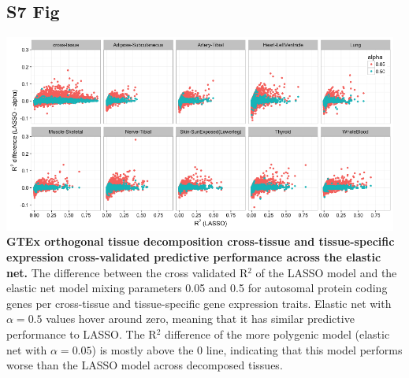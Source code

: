 \documentclass[10pt,letterpaper]{article}
\begin{document}
\begin{singlespace}
\subsection*{S7 Fig}
\includegraphics[width=13cm]{Figures/GenArch_Supp/S7Fig.png}
\label{S7_Fig}
{\bf GTEx orthogonal tissue decomposition cross-tissue and tissue-specific expression cross-validated predictive performance across the elastic net.} The difference between the cross validated R$^2$ of the LASSO model and the elastic net model mixing parameters 0.05 and 0.5 for autosomal protein coding genes per cross-tissue and tissue-specific gene expression traits. Elastic net with $\alpha=0.5$ values hover around zero, meaning that it has similar predictive performance to LASSO. The R$^2$ difference of the more polygenic model (elastic net with $\alpha=0.05$) is mostly above the 0 line, indicating that this model performs worse than the LASSO model across decomposed tissues.
\end{singlespace}

\pagebreak
\end{document}
